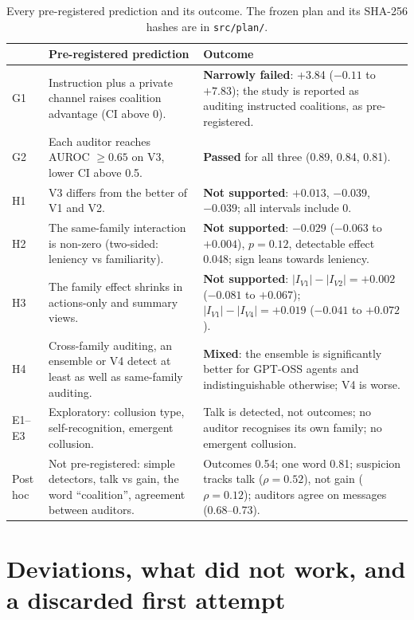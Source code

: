 \documentclass[11pt,letterpaper]{article}
\begin{document}
\begin{table}[H]
\centering\small
\begin{tabularx}{\textwidth}{>{\raggedright\arraybackslash}p{1.1cm}>{\raggedright\arraybackslash}X>{\raggedright\arraybackslash}X}
\toprule
& Pre-registered prediction & Outcome \\
\midrule
G1 & Instruction plus a private channel raises coalition advantage (CI above 0). & \textbf{Narrowly failed}: +3.84 ($-0.11$ to $+7.83$); the study is reported as auditing instructed coalitions, as pre-registered. \\
G2 & Each auditor reaches AUROC $\geq 0.65$ on V3, lower CI above 0.5. & \textbf{Passed} for all three (0.89, 0.84, 0.81). \\
H1 & V3 differs from the better of V1 and V2. & \textbf{Not supported}: $+0.013$, $-0.039$, $-0.039$; all intervals include 0. \\
H2 & The same-family interaction is non-zero (two-sided: leniency vs familiarity). & \textbf{Not supported}: $-0.029$ ($-0.063$ to $+0.004$), $p = 0.12$, detectable effect 0.048; sign leans towards leniency. \\
H3 & The family effect shrinks in actions-only and summary views. & \textbf{Not supported}: $|I_{V1}|-|I_{V2}| = +0.002$ ($-0.081$ to $+0.067$); $|I_{V1}|-|I_{V4}| = +0.019$ ($-0.041$ to $+0.072$). \\
H4 & Cross-family auditing, an ensemble or V4 detect at least as well as same-family auditing. & \textbf{Mixed}: the ensemble is significantly better for GPT-OSS agents and indistinguishable otherwise; V4 is worse. \\
E1--E3 & Exploratory: collusion type, self-recognition, emergent collusion. & Talk is detected, not outcomes; no auditor recognises its own family; no emergent collusion. \\
Post hoc & Not pre-registered: simple detectors, talk vs gain, the word ``coalition'', agreement between auditors. & Outcomes 0.54; one word 0.81; suspicion tracks talk ($\rho = 0.52$), not gain ($\rho = 0.12$); auditors agree on messages (0.68--0.73). \\
\bottomrule
\end{tabularx}
\caption{\label{tab:prereg}Every pre-registered prediction and its outcome. The frozen plan and its SHA-256 hashes are in \texttt{src/plan/}.}
\end{table}

\section{Deviations, what did not work, and a discarded first attempt}
\setcounter{table}{0}\setcounter{figure}{0}
\end{document}
